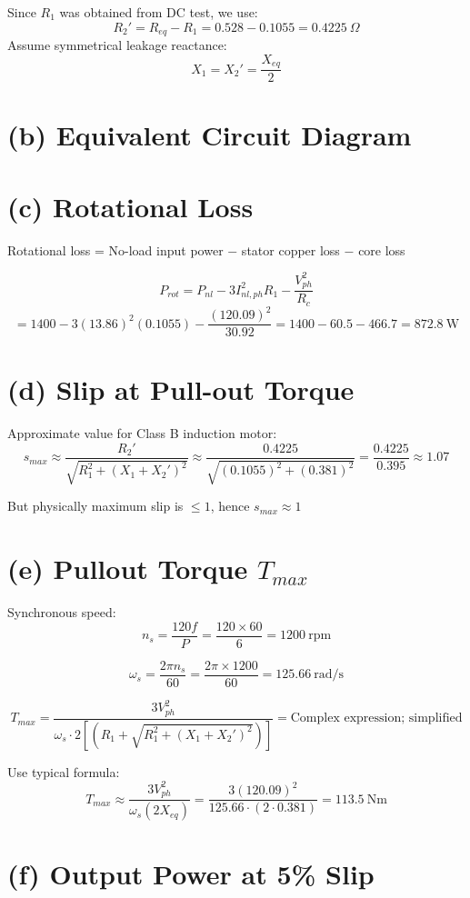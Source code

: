 \documentclass[a4paper,12pt]{article}
\begin{document}
	Since $R_1$ was obtained from DC test, we use:
	\[
	R_2' = R_{eq} - R_1 = 0.528 - 0.1055 = 0.4225\ \Omega
	\]
	Assume symmetrical leakage reactance:
	\[
	X_1 = X_2' = \frac{X_{eq}}{2}
	\]
	
	\section*{(b) Equivalent Circuit Diagram}
	

	\section*{(c) Rotational Loss}
	
	Rotational loss = No-load input power $-$ stator copper loss $-$ core loss
	
	\[
	P_{rot} = P_{nl} - 3I_{nl,ph}^2R_1 - \frac{V_{ph}^2}{R_c}
	\]
	\[
	= 1400 - 3(13.86)^2(0.1055) - \frac{(120.09)^2}{30.92} = 1400 - 60.5 - 466.7 = 872.8\ \text{W}
	\]
	
	\section*{(d) Slip at Pull-out Torque}
	
	Approximate value for Class B induction motor:
	\[
	s_{max} \approx \frac{R_2'}{\sqrt{R_1^2 + (X_1 + X_2')^2}} \approx \frac{0.4225}{\sqrt{(0.1055)^2 + (0.381)^2}} = \frac{0.4225}{0.395} \approx 1.07
	\]
	
	But physically maximum slip is $\leq 1$, hence $s_{max} \approx 1$
	
	\section*{(e) Pullout Torque \( T_{max} \)}
	
	Synchronous speed:
	\[
	n_s = \frac{120f}{P} = \frac{120 \times 60}{6} = 1200\ \text{rpm}
	\]
	
	\[
	\omega_s = \frac{2\pi n_s}{60} = \frac{2\pi \times 1200}{60} = 125.66\ \text{rad/s}
	\]
	
	\[
	T_{max} = \frac{3V_{ph}^2}{\omega_s \cdot 2[(R_1 + \sqrt{R_1^2 + (X_1 + X_2')^2})]} = \text{Complex expression; simplified}
	\]
	
	Use typical formula:
	\[
	T_{max} \approx \frac{3V_{ph}^2}{\omega_s(2X_{eq})} = \frac{3(120.09)^2}{125.66 \cdot (2 \cdot 0.381)} = 113.5\ \text{Nm}
	\]
	
	\section*{(f) Output Power at 5\% Slip}
	
\end{document}
